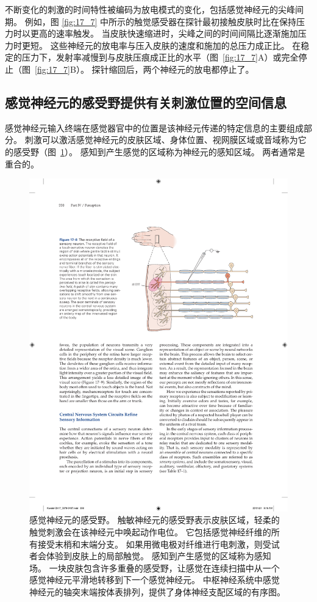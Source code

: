 不断变化的刺激的时间特性被编码为放电模式的变化，包括感觉神经元的尖峰间期。
例如，图 \ref{fig:17_7} 中所示的触觉感受器在探针最初接触皮肤时比在保持压力时以更高的速率触发。
当皮肤快速缩进时，尖峰之间的时间间隔比逐渐施加压力时更短。
这些神经元的放电率与压入皮肤的速度和施加的总压力成正比。
在稳定的压力下，发射率减慢到与皮肤压痕成正比的水平（图~\ref{fig:17_7}A）或完全停止（图~\ref{fig:17_7}B）。 
探针缩回后，两个神经元的放电都停止了。


\subsection{感觉神经元的感受野提供有关刺激位置的空间信息}

感觉神经元输入终端在感觉器官中的位置是该神经元传递的特定信息的主要组成部分。 
刺激可以激活感觉神经元的皮肤区域、身体位置、视网膜区域或音域称为它的感受野（图~\ref{fig:17_8}）。 
感知到产生感觉的区域称为神经元的感知区域。
两者通常是重合的。


\begin{figure}[htbp]
	\centering
	\includegraphics[width=0.75\linewidth]{chap17/fig_17_8}
	\caption{感觉神经元的感受野。
		触敏神经元的感受野表示皮肤区域，轻柔的触觉刺激会在该神经元中唤起动作电位。
		它包括感觉神经纤维的所有接受末梢和末端分支。
		如果用微电极对纤维进行电刺激，则受试者会体验到皮肤上的局部触觉。
		感知到产生感觉的区域称为感知场。
		一块皮肤包含许多重叠的感受野，让感觉在连续扫描中从一个感觉神经元平滑地转移到下一个感觉神经元。
		中枢神经系统中感觉神经元的轴突末端按体表排列，提供了身体神经支配区域的有序图。}
	\label{fig:17_8}
\end{figure}

